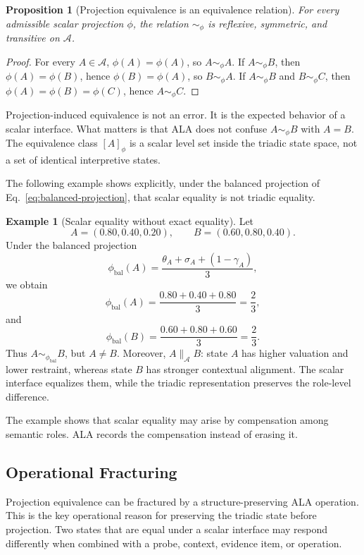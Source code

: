 \documentclass[reqno,final]{amsart}
\theoremstyle{definition}
\newtheorem{example}{Example}
\theoremstyle{plain}
\newtheorem{proposition}{Proposition}
\theoremstyle{remark}
\providecommand{\cA}{\mathcal{A}}
\providecommand{\parallelA}{\parallel_{\mathcal A}}
\begin{document}
\begin{proposition}[Projection equivalence is an equivalence relation]
For every admissible scalar projection \(\phi\), the relation \(\sim_\phi\) is reflexive, symmetric, and transitive on \(\cA\).
\end{proposition}

\begin{proof}
For every \(A\in\cA\), \(\phi(A)=\phi(A)\), so \(A\sim_\phi A\). If \(A\sim_\phi B\), then \(\phi(A)=\phi(B)\), hence \(\phi(B)=\phi(A)\), so \(B\sim_\phi A\). If \(A\sim_\phi B\) and \(B\sim_\phi C\), then \(\phi(A)=\phi(B)=\phi(C)\), hence \(A\sim_\phi C\).
\end{proof}

Projection-induced equivalence is not an error. It is the expected behavior of a scalar interface. What matters is that ALA does not confuse \(A\sim_\phi B\) with \(A=B\). The equivalence class \([A]_\phi\) is a scalar level set inside the triadic state space, not a set of identical interpretive states.

The following example shows explicitly, under the balanced projection of Eq.~\eqref{eq:balanced-projection}, that scalar equality is not triadic equality.

\begin{example}[Scalar equality without exact equality]
Let
\[
A=(0.80,0.40,0.20),
\qquad
B=(0.60,0.80,0.40).
\]
Under the balanced projection
\[
\phi_{\mathrm{bal}}(A)=\frac{\theta_A+\sigma_A+(1-\gamma_A)}{3},
\]
we obtain
\[
\phi_{\mathrm{bal}}(A)=\frac{0.80+0.40+0.80}{3}=\frac{2}{3},
\]
and
\[
\phi_{\mathrm{bal}}(B)=\frac{0.60+0.80+0.60}{3}=\frac{2}{3}.
\]
Thus \(A\sim_{\phi_{\mathrm{bal}}}B\), but \(A\neq B\). Moreover, \(A\parallelA B\): state \(A\) has higher valuation and lower restraint, whereas state \(B\) has stronger contextual alignment. The scalar interface equalizes them, while the triadic representation preserves the role-level difference.
\end{example}

The example shows that scalar equality may arise by compensation among semantic roles. ALA records the compensation instead of erasing it.

\subsection{Operational Fracturing}
Projection equivalence can be fractured by a structure-preserving ALA operation. This is the key operational reason for preserving the triadic state before projection. Two states that are equal under a scalar interface may respond differently when combined with a probe, context, evidence item, or operation.
\end{document}
